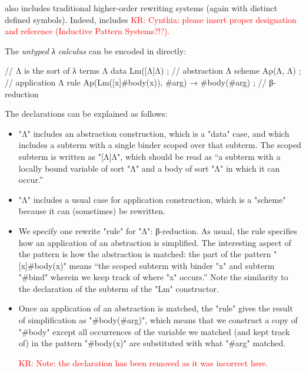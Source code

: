 \documentclass[letterpaper,11pt]{article}
\newcommand{\KR}[1]{\textcolor{red}{KR: #1}}
\begin{document}
\hax also includes traditional higher-order rewriting systems (again with distinct defined symbols).
Indeed, \hax includes \KR{Cynthia: please insert proper designation and reference (Inductive Pattern
  Systems?!?).}

\begin{example}\label{ex:lambda}
  The \emph{untyped λ calculus} can be encoded in \hax directly:
  \begin{hacs}[numbers=right,texcl]
    // Λ is the sort of λ terms
    Λ  data Lm([Λ]Λ) ;                                        // abstraction
    Λ  scheme Ap(Λ, Λ) ;                                      // application
    Λ  rule Ap(Lm([x]#body(x)), #arg) →  #body(#arg) ;    // β-reduction
  \end{hacs}
  The declarations can be explained as follows:
  \begin{itemize}

  \item "Λ" includes an abstraction construction, which is a "data" case, and which includes a
    subterm with a single binder scoped over that subterm. The scoped subterm is written as
    "[Λ]Λ", which should be read as ``a subterm with a locally bound variable of sort "Λ" and a
    body of sort "Λ" in which it can occur.''

  \item "Λ" includes a usual case for application construction, which is a "scheme" because it
    can (sometimes) be rewritten.

  \item We specify one rewrite "rule" for "Λ": β-reduction. As usual, the rule specifies how an
    application of an abstraction is simplified. The interesting aspect of the pattern is how the
    abstraction is matched: the part of the pattern "[x]#body(x)" means ``the scoped subterm with
    binder "x" and subterm "#bind" wherein we keep track of where "x" occurs.'' Note the similarity
    to the declaration of the subterm of the "Lm" constructor.

  \item Once an application of an abstraction is matched, the "rule" gives the result of
    simplification as "#body(#arg)", which means that we construct a copy of "#body" except all
    occurrences of the variable we matched (and kept track of) in the pattern "#body(x)" are
    substituted with what "#arg" matched.

    \KR{Note: the  declaration has been removed as it was incorrect here.}


\end{itemize}
\end{example}
\end{document}
